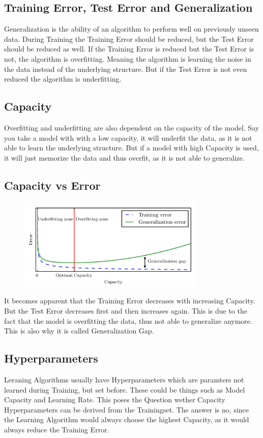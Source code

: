 \documentclass[a4paper]{article}
\begin{document}
\subsection{Training Error, Test Error and Generalization}
Generalization is the ability of an algorithm to perform well on previously unseen data. During Training the Training Error should be reduced, but the Test Error should be reduced as well. If the Training Error is reduced but the Test Error is not, the algorithm is overfitting. Meaning the algorithm is learning the noise in the data instead of the underlying structure. But if the Test Error is not even reduced the algorithm is underfitting.

\subsection{Capacity}
Overfitting and underfitting are also dependent on the capacity of the model. Say you take a model with with a low capacity, it will underfit the data, as it is not able to learn the underlying structure. But if a model with high Capacity is used, it will just memorize the data and thus overfit, as it is not able to generalize.

\subsection{Capacity vs Error}
\begin{figure}[h]
    \centering
    \includegraphics[width=0.8\textwidth]{images/capacity.png}
    \caption{}
    \label{fig:}
\end{figure}
It becomes apparent that the Training Error decreases with increasing Capacity. But the Test Error decreases first and then increases again. This is due to the fact that the model is overfitting the data, thus not able to generalize anymore. This is also why it is called Generalization Gap.

\subsection{Hyperparameters}
Leraning Algorithms usually have Hyperparameters which are paramters not learned during Training, but set before. These could be things such as Model Capacity and Learning Rate. This poses the Question wether Capacity Hyperparameters can be derived from the Trainingset. The answer is no, since the Learning Algorithm would always choose the highest Capacity, as it would always reduce the Training Error.
\end{document}
